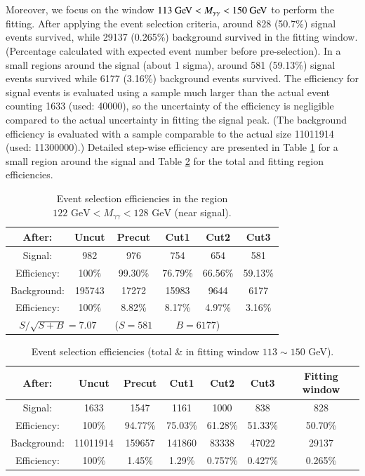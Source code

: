 \documentclass[11pt,a4paper]{cepcnote}
\begin{document}
Moreover, we focus on the window $113\GeV<M_{\gamma\gamma}<150\GeV$ to perform the fitting. After applying the event selection criteria, around 828 (50.7\%) signal events survived, while 29137 (0.265\%) background survived in the fitting window. (Percentage calculated with expected event number before pre-selection). In a small regions around the signal (about 1 sigma), around 581 (59.13\%) signal events survived while 6177 (3.16\%) background events survived. The efficiency for signal events is evaluated using a sample much larger than the actual event counting 1633 (used: 40000), so the uncertainty of the efficiency is negligible compared to the actual uncertainty in fitting the signal peak. (The background efficiency is evaluated with a sample comparable to the actual size 11011914 (used: 11300000).) Detailed step-wise efficiency are presented in Table \ref{tab:eff} for a small region around the signal and Table \ref{tab:effgen} for the total and fitting region efficiencies.

\begin{table}[h]
\caption{Event selection efficiencies in the region $122\text{ GeV}<M_{\gamma\gamma}<128\text{ GeV}$ (near signal).}
\label{tab:eff}
\centering
\begin{tabular} {c|c c c c c}
\hline\hline
After: & Uncut & Precut & Cut1 & Cut2 & Cut3 \\
\hline
Signal: & 982 & 976 & 754 & 654 & 581 \\
Efficiency: & 100\% & 99.30\% & 76.79\% & 66.56\% & 59.13\% \\
\hline
Background: & 195743 & 17272 & 15983 & 9644 & 6177 \\
Efficiency: & 100\% & 8.82\% & 8.17\% & 4.97\% & 3.16\% \\
\hline
\multicolumn{2}{c}{$S/\sqrt{S+B}=7.07$} & ($S=581$ & \multicolumn{2}{c}{$B=6177$)} \\
\hline\hline
\end{tabular}
\end{table}

\begin{table}[h]
	\caption{Event selection efficiencies (total \& in fitting window $113\sim150$ GeV).}
\label{tab:effgen}
\centering
\begin{tabular} {c|c c c c c c}
\hline\hline
After: & Uncut & Precut & Cut1 & Cut2 & Cut3 & Fitting window\\
\hline
Signal: & 1633 & 1547 & 1161 & 1000 & 838 & 828 \\
Efficiency: & 100\% & 94.77\% & 75.03\% & 61.28\% & 51.33\% & 50.70\% \\
\hline
Background: & 11011914 & 159657 & 141860 & 83338 & 47022 & 29137 \\
Efficiency: & 100\% & 1.45\% & 1.29\% & 0.757\% & 0.427\% & 0.265\% \\
\hline\hline
\end{tabular}
\end{table}
\end{document}
